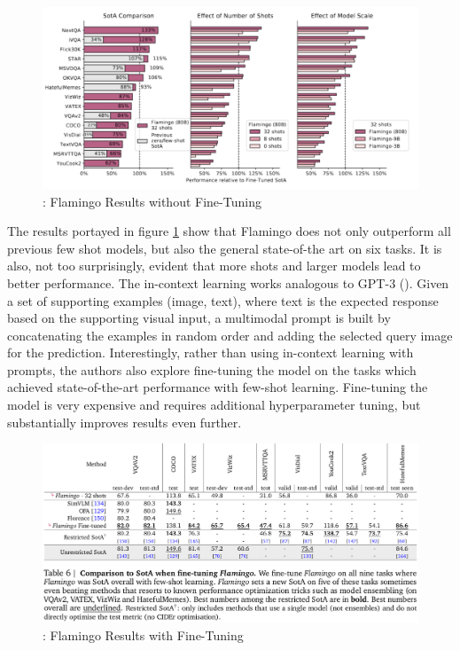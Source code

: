 \documentclass[
]{krantz}
\begin{document}
\begin{figure}

{\centering \includegraphics[width=1\linewidth]{figures/05-chapter2/flamingoresult} 

}

\caption{\citet{alayrac2022flamingo}: Flamingo Results without Fine-Tuning}\label{fig:flamingoresult}
\end{figure}



The results portayed in figure \ref{fig:flamingoresult} show that Flamingo does not only outperform all previous few shot models, but also the general state-of-the art on six tasks. It is also, not too surprisingly, evident that more shots and larger models lead to better performance. The in-context learning works analogous to GPT-3 (\citet{brown2020language}). Given a set of supporting examples (image, text), where text is the expected response based on the supporting visual input, a multimodal prompt is built by concatenating the examples in random order and adding the selected query image for the prediction. Interestingly, rather than using in-context learning with prompts, the authors also explore fine-tuning the model on the tasks which achieved state-of-the-art performance with few-shot learning. Fine-tuning the model is very expensive and requires additional hyperparameter tuning, but substantially improves results even further.

\begin{figure}

{\centering \includegraphics[width=1\linewidth]{figures/05-chapter2/flamingofinetune} 

}

\caption{\citet{alayrac2022flamingo}: Flamingo Results with Fine-Tuning}\label{fig:flamingfinetune}
\end{figure}
\end{document}
